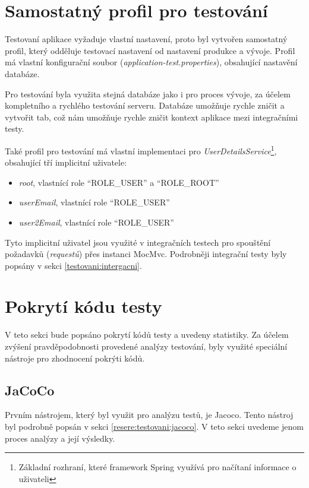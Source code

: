 \section{Samostatný profil pro testování}

    Testovaní aplikace vyžaduje vlastní nastavení, proto byl vytvořen samostatný profil, který odděluje testovací nastavení od nastavení produkce a vývoje. Profil má vlastní konfigurační soubor (\textit{application-test.properties}), obsahující nastavění databáze.
    
    Pro testování byla  využita stejná databáze jako i pro proces vývoje, za účelem kompletního a rychlého testování serveru. Databáze umožňuje rychle zničit a vytvořit tab, což nám umožňuje rychle zničit kontext aplikace mezi integračními testy.
    
    Také profil pro testování má vlastní implementaci pro \textit{UserDetailsService}\footnote{Základní rozhraní, které framework Spring využívá pro načítaní informace o uživateli}, obsahující tří implicitní uživatele:
    \begin{itemize}
            \item \textit{root}, vlastnící role \enquote{ROLE\_USER} a \enquote{ROLE\_ROOT} 
            \item \textit{userEmail}, vlastnící role \enquote{ROLE\_USER}
            \item \textit{user2Email}, vlastnící role \enquote{ROLE\_USER}
    \end{itemize}
    Tyto implicitní uživatel jsou využité v integračních testech pro spouštění požadavků (\textit{requestů}) přes instanci MocMvc. Podrobněji integrační testy byly popsány v sekci \ref{testovani:intergacni}.
    
\section{Pokrytí kódu testy}\label{testovani:pokryti}
    V teto sekci bude popsáno pokrytí kódů testy a uvedeny statistiky. Za účelem zvýšení pravděpodobnosti provedené analýzy testování, byly využité speciální nástroje pro zhodnocení pokrýti kódů.
    \subsection{JaCoCo}
    Prvním nástrojem, který byl využit pro analýzu testů, je Jacoco. Tento nástroj byl podrobně popsán v sekci \ref{resere:testovani:jacoco}. V teto sekci uvedeme jenom proces analýzy a její výsledky.
    
